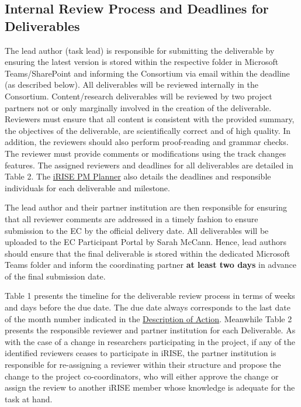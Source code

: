 \documentclass[
]{article}
\begin{document}
\hypertarget{internal-review-process-and-deadlines-for-deliverables}{%
\subsection{Internal Review Process and Deadlines for Deliverables}\label{internal-review-process-and-deadlines-for-deliverables}}

The lead author (task lead) is responsible for submitting the
deliverable by ensuring the latest version is stored within the
respective folder in Microsoft Teams/SharePoint and informing the
Consortium via email within the deadline (as described below). All
deliverables will be reviewed internally in the Consortium.
Content/research deliverables will be reviewed by two project partners
not or only marginally involved in the creation of the deliverable.
Reviewers must ensure that all content is consistent with the provided
summary, the objectives of the deliverable, are scientifically correct
and of high quality. In addition, the reviewers should also perform
proof-reading and grammar checks. The reviewer must provide comments or
modifications using the track changes features. The assigned reviewers
and deadlines for all deliverables are detailed in Table 2. The \href{https://tasks.office.com/charitede.onmicrosoft.com/en-US/Home/Planner/\#/plantaskboard?groupId=63cd0d10-aa1b-4db9-9bb0-ed23b58ec69b\&planId=P4fliqzuUEeyiZo6z3Z3L5YAAegq}{iRISE
PM
Planner}
also details the deadlines and responsible individuals for each
deliverable and milestone.

The lead author and their partner institution are then responsible for
ensuring that all reviewer comments are addressed in a timely fashion to
ensure submission to the EC by the official delivery date. All
deliverables will be uploaded to the EC Participant Portal by Sarah
McCann. Hence, lead authors should ensure that the final deliverable is
stored within the dedicated Microsoft Teams folder and inform the
coordinating partner \textbf{at least two days} in advance of the
final submission date.

Table 1 presents the timeline for the deliverable review process in
terms of weeks and days before the due date. The due date always
corresponds to the last date of the month number indicated in the
\href{https://charitede.sharepoint.com/:b:/r/sites/iRISE/Shared\%20Documents/General/Grant\%20Agreement/GA\%20amendment\%20Sept.\%202023/iRISE_Annex1B_DoA_2023-09-25_v4_clean.pdf?csf=1\&web=1\&e=CGlIBC}{Description of
Action}.
Meanwhile Table 2 presents the responsible reviewer and partner
institution for each Deliverable. As with the case of a change in
researchers participating in the project, if any of the identified
reviewers ceases to participate in iRISE, the partner institution is
responsible for re-assigning a reviewer within their structure and
propose the change to the project co-coordinators, who will either
approve the change or assign the review to another iRISE member whose
knowledge is adequate for the task at hand.
\end{document}
